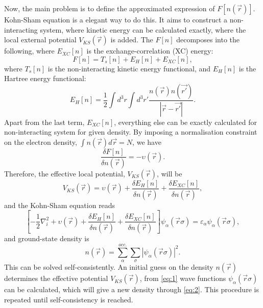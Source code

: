 Now, the main problem is to define the approximated expression of $F[n(\vec{r})]$. Kohn-Sham equation is a elegant way to do this. It aims to construct a non-interacting system, where kinetic energy can be calculated exactly, where the local external potential $V_{KS}(\vec{r})$ is added. The $F[n]$ decomposes into the following, where $E_{XC}[n]$ is the exchange-correlation (XC) energy:
\begin{equation}
F[n]=T_s[n]+E_H[n]+E_{XC}[n],
\end{equation}
where $T_s[n]$ is the non-interacting kinetic energy functional, and $E_H[n]$ is the Hartree energy functional:
\begin{equation}
E_H[n]=\frac{1}{2}\int d^3r\int d^3r\prime\frac{n(\vec{r})n(\vec{r\prime})}{|\vec{r}-\vec{r\prime}|}.
\end{equation}
Apart from the last term, $E_{XC}[n]$, everything else can be exactly calculated for non-interacting system for given density. By imposing a normalisation constraint on the electron density, $\int n(\vec{r})d\vec{r}=N$, we have
\begin{equation}
\frac{\delta F[n]}{\delta n(\vec{r})}=-\upsilon(\vec{r}).
\end{equation}
Therefore, the effective local potential, $V_{KS}(\vec{r})$, will be
\begin{equation}
V_{KS}(\vec{r})=\upsilon(\vec{r})+\frac{\delta E_H[n]}{\delta n(\vec{r})}+\frac{\delta E_{XC}[n]}{\delta n(\vec{r})},
\end{equation}
and the Kohn-Sham equation reads
\begin{equation}\label{eq:1}
\left[ -\frac{1}{2}\nabla_i^2+\upsilon(\vec{r})+\frac{\delta E_H[n]}{\delta n(\vec{r})}+\frac{\delta E_{XC}[n]}{\delta n(\vec{r})}\right]\mathit{\psi}_\alpha(\vec{r}\sigma)=\varepsilon_\alpha\mathit{\psi}_\alpha(\vec{r}\sigma),
\end{equation}
and ground-state density is 
\begin{equation}\label{eq:2}
n(\vec{r})=\sum_\alpha^{occ.}\sum_\sigma|\mathit{\psi}_\alpha(\vec{r}\sigma)|^2.
\end{equation}
This can be solved self-consistently. An initial guess on the density $n(\vec{r})$ determines the effective potential $V_{KS}(\vec{r})$, from \autoref{eq:1} wave functions $\mathit{\psi}_\alpha(\vec{r}\sigma)$ can be calculated, which will give a new density through \autoref{eq:2}. This procedure is repeated until self-consistency is reached. 

